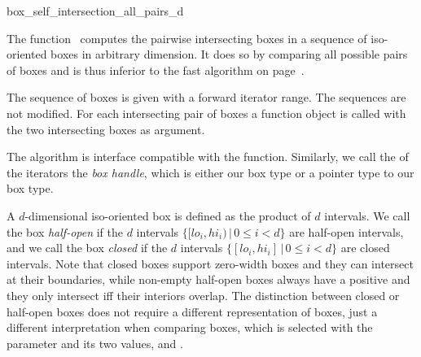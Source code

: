

\begin{ccRefFunction}{box_self_intersection_all_pairs_d}

\ccDefinition
  
The function \ccRefName\ computes the pairwise intersecting boxes
in a sequence of iso-oriented boxes in arbitrary dimension.
It does so by comparing all possible pairs of boxes and is thus
inferior to the fast  algorithm on 
page~\pageref{ccRef_CGAL::box_self_intersection_d}.

The sequence of boxes is given with a forward iterator range. The
sequences are not modified. For each intersecting pair of boxes a
 function object is called with the two intersecting
boxes as argument.

The algorithm is interface compatible with the
 function. Similarly, we call the
 of the iterators the \emph{box handle}, which is
either our box type or a pointer type to our box type.

A $d$-dimensional iso-oriented box is defined as the
 product of $d$ intervals. We call the
box \emph{half-open} if the $d$ intervals $\{ [lo_i,hi_i) \,|\, 0 \leq
i < d\}$ are half-open intervals, and we call the box \emph{closed} if
the $d$ intervals $\{ [lo_i,hi_i] \,|\, 0 \leq i < d\}$ are closed
intervals. Note that closed boxes support zero-width boxes and they
can intersect at their boundaries, while non-empty half-open boxes
always have a positive  and they only intersect iff their
interiors overlap.  The distinction between closed or half-open boxes
does not require a different representation of boxes, just a different
interpretation when comparing boxes, which is selected with the
 parameter and its two values,
 and
.


\end{ccRefFunction}
